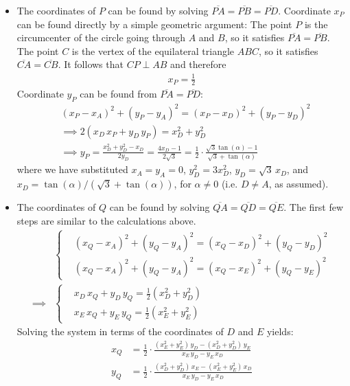 \begin{itemize}
\item The coordinates of $P$ can be found by solving $\overline{PA}=\overline{PB}=\overline{PD}$. Coordinate $x_{P}$ can be found directly by a simple geometric argument: The point $P$ is the circumcenter of the circle going through $A$ and $B$, so it satisfies $\overline{PA}=\overline{PB}$. The point $C$ is the vertex of the equilateral triangle $ABC$, so it satisfies $\overline{CA}=\overline{CB}$. It follows that $CP \perp AB$ and therefore
\begin{align*}
x_{P} = \frac{1}{2}
\end{align*}
Coordinate $y_{P}$ can be found from $\overline{PA}=\overline{PD}$:
\begin{align*}
& (x_{P}-x_{A})^{2} + (y_{P}-y_{A})^{2} 
  = (x_{P}-x_{D})^{2} + (y_{P}-y_{D})^{2} 
\\
& \implies
2(x_{D}\, x_{P} + y_{D}\, y_{P})
  = x_{D}^{2} + y_{D}^{2}
\\[1ex]
& \implies
y_{P}
  = \frac{x_{D}^{2} + y_{D}^{2} - x_{D}}{2y_{D}}
  = \frac{4x_{D}-1}{2\sqrt{3}}
  = \frac{1}{2} \cdot \frac{\sqrt{3}\tan(\alpha)-1}{\sqrt{3}+\tan(\alpha)}
\end{align*}
where we have substituted $x_{A}=y_{A}=0$, $y_{D}^{2}=3x_{D}^{2}$, $y_{D}=\sqrt{3}\,x_{D}$, and $x_{D}=\tan(\alpha)/(\sqrt{3}+\tan(\alpha))$, for $\alpha\ne0$ (i.e. $D \ne A$, as assumed).

\item The coordinates of $Q$ can be found by solving $\overline{QA}=\overline{QD}=\overline{QE}$. The first few steps are similar to the calculations above. 
\begin{align*}
& \scriptscriptstyle
\begin{cases}
& (x_{Q}-x_{A})^{2} + (y_{Q}-y_{A})^{2} 
  = (x_{Q}-x_{D})^{2} + (y_{Q}-y_{D})^{2} 
\\
& (x_{Q}-x_{A})^{2} + (y_{Q}-y_{A})^{2} 
  = (x_{Q}-x_{E})^{2} + (y_{Q}-y_{E})^{2} 
\end{cases}
\\ \implies
& \scriptscriptstyle
\begin{cases}
& x_{D} \, x_{Q} + y_{D} \, y_{Q} = \frac{1}{2} (x_{D}^{2}+y_{D}^{2})
\\
& x_{E} \, x_{Q} + y_{E} \, y_{Q} = \frac{1}{2} (x_{E}^{2}+y_{E}^{2})
\end{cases}
\end{align*}
Solving the system in terms of the coordinates of $D$ and $E$ yields:
\begin{align*}
x_{Q} & = 
\frac{1}{2} \cdot \frac{(x_{E}^{2}+y_{E}^{2}) \, y_{D} - (x_{D}^{2}+y_{D}^{2}) \, y_{E}}{x_{E} \, y_{D} - y_{E} \, x_{D}}
\\
y_{Q} & = 
\frac{1}{2} \cdot \frac{(x_{D}^{2}+y_{D}^{2}) \, x_{E} - (x_{E}^{2}+y_{E}^{2}) \, x_{D}}{x_{E} \, y_{D} - y_{E} \, x_{D}}
\end{align*}

\end{itemize}


